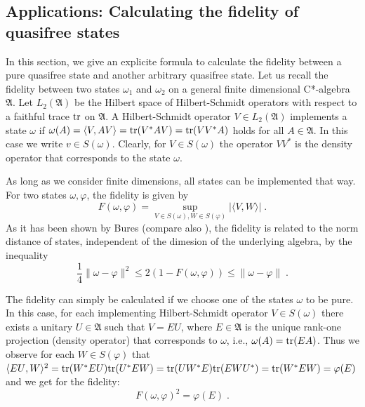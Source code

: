 \documentclass[pra,twoside,amsmath,amsfonts,amssymb,superscriptaddress,showpacs]{revtex4}
\def\6#1{{\mathfrak #1}}
\def\tr{{\rm tr}}
\newcommand{\SPROD}[2]{\langle{#1},{#2}\rangle}
\begin{document}
\subsection{Applications: Calculating the fidelity of quasifree states}
\label{subsec:applications}
In this section, we give an explicite formula to calculate the fidelity between a pure quasifree
state and another arbitrary quasifree state. Let us recall the fidelity between two states
$\omega_1$ and $\omega_2$ on a general finite dimensional C*-algebra $\6A$. Let $L_2(\6A)$ be the
Hilbert space of Hilbert-Schmidt operators with respect to a faithful trace $\tr$ on $\6A$. A
Hilbert-Schmidt operator
$V\in L_2(\6A)$ implements a state $\omega$ if $\omega(A)=\SPROD{V}{A V}=\tr(V^*AV)=\tr(VV^*A)$
holds for all $A\in \6A$. In this case we write $v\in S(\omega)$. Clearly, for $V\in S(\omega)$ the
operator $VV^*$ is the density operator that corresponds to the state $\omega$. 

As long as we consider finite dimensions, all states can be implemented that way. For two states
$\omega,\varphi$, the fidelity is given by 
\begin{equation}
F(\omega,\varphi)=\sup_{V\in S(\omega),W\in S(\varphi)}|\SPROD{V}{W}| \; .
\end{equation}
As it has been shown by Bures \cite{Bur69} (compare also \cite{KretSchlWer08}), the fidelity is
related to the norm distance of states, independent
of the dimesion of the underlying algebra, by the inequality
\begin{equation}
\frac{1}{4}\|\omega-\varphi\|^2\leq 2(1-F(\omega,\varphi))\leq\|\omega-\varphi\| \; .
\end{equation}

The fidelity can simply be calculated if we choose one of the states $\omega$ to be pure. In this
case, for each implementing Hilbert-Schmidt operator $V\in S(\omega)$ there exists a unitary $U\in
\6A$ such that $V=EU$, where $E\in\6A$
is the unique rank-one projection (density operator) that corresponds to $\omega$, i.e.,
$\omega(A)=\tr(EA)$. Thus we observe for each $W\in S(\varphi)$ that
$\SPROD{EU}{W}^2=\tr(W^*EU)\tr(U^*E W)=\tr(UW^*E)\tr(E WU^*)=\tr(W^*EW)=\varphi(E)$ and we get for
the fidelity:
\begin{equation}
F(\omega,\varphi)^2=\varphi(E) \; . 
\end{equation}
\end{document}
